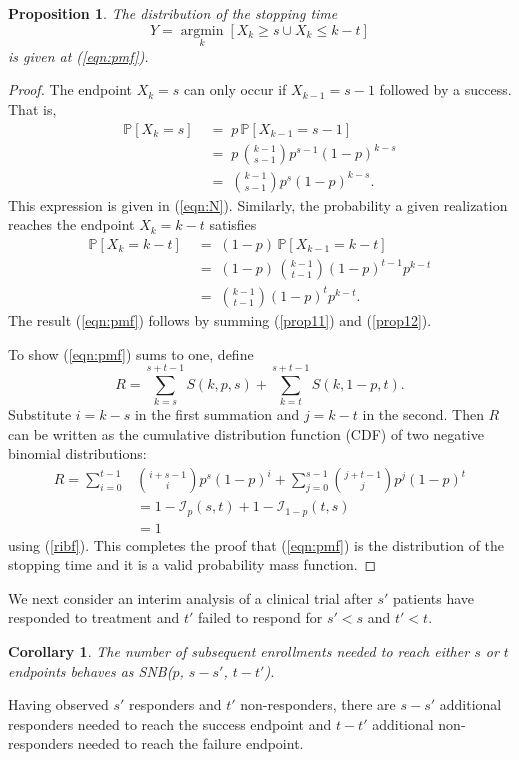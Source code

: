 \documentclass[sii]{ipart}
\DeclareMathOperator*{\argmin}{argmin}
\newcommand*{\argminl}{\argmin\limits}
\newtheorem{prop}{Proposition}
\newtheorem{corollary}{Corollary}
\begin{document}
\begin{prop} \label{stopping_time}
The distribution of the stopping time
\begin{equation*}
Y = \argminl_k \left[X_k \geq s \cup X_k \leq k-t \right]
\end{equation*}
is given at (\ref{eqn:pmf}).
\end{prop}
\begin{proof}

The endpoint $X_k = s$ can only occur if $X_{k-1} = s-1$ followed by a success. That is, 
\begin{align} \label{prop11}
\mathbb{P} [X_k =s ] \;&=\; p \, \mathbb{P} [X_{k-1} = s-1 ] \nonumber \\
 &=\; p\, {k-1 \choose s-1} p^{s-1} (1-p)^{k-s} \nonumber \\
 &=\; {k-1 \choose s-1} p^{s} (1-p)^{k-s}.
\end{align}
This expression is given
in (\ref{eqn:N}). 
Similarly, the probability a given realization reaches the endpoint $X_k = k-t$
satisfies 
\begin{align} \label{prop12}
\mathbb{P} [X_k = k-t ] \;&=\; (1-p) \, \mathbb{P} [X_{k-1} = k-t ] \nonumber \\
 &=\; (1-p)\, {k-1 \choose t-1} (1-p)^{t-1} p^{k-t} \nonumber \\
&=\; {k-1 \choose t-1} (1-p)^{t} p^{k-t}.
\end{align}
The result (\ref{eqn:pmf}) follows by summing (\ref{prop11}) and (\ref{prop12}).

To show (\ref{eqn:pmf}) sums to one, define
\begin{equation*} 
R = \sum_{k=s}^{s+t-1} S(k, p, s) + \sum_{k=t}^{s+t-1} S(k, 1-p, t).
\end{equation*}
Substitute $i=k-s$ in the first summation and $j=k-t$ in the second. Then
$R$ can be written as the cumulative distribution function (CDF) of two
negative binomial distributions:
\begin{align*}
R = \sum_{i=0}^{t-1} &{i+s-1 \choose i} p^s (1-p)^i +
\sum_{j=0}^{s-1}  {j+t-1 \choose j} p^j  (1-p)^t \\
   &= 1-\mathcal{I}_p(s, t) + 1 - \mathcal{I}_{1-p}(t, s) \\
   &= 1
\end{align*}
using (\ref{ribf}). This completes the proof that (\ref{eqn:pmf}) is the distribution 
of the stopping time and it is a valid probability mass function.
\end{proof}

We next consider an interim analysis of a clinical trial after $s'$ 
patients have responded to treatment 
and $t'$ failed to respond for $s' < s$ and $t' < t$.
\begin{corollary} \label{conditional_distribution}
The number of subsequent enrollments needed 
to reach either $s$ or $t$ endpoints behaves as SNB($p$, $s-s'$, $t-t'$).
\end{corollary}
Having observed $s'$ responders and $t'$ non-responders, there are $s-s'$ 
additional responders needed to reach the success endpoint and $t-t'$ additional 
non-responders needed to reach the failure endpoint.
\end{document}
